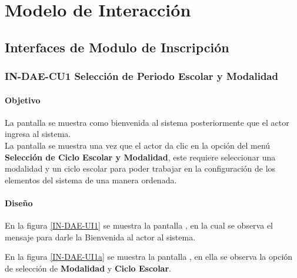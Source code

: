 \chapter{Modelo de Interacción}

\section{Interfaces de Modulo de Inscripción}
\subsection{IN-DAE-CU1 Selección de Periodo Escolar y Modalidad}

\subsubsection{Objetivo}
	
	La pantalla  se muestra como bienvenida al sistema posteriormente que el actor ingresa al sistema.\\
	
	
	La pantalla   se muestra una vez que el actor da clic en la opción del menú \textbf{Selección de Ciclo Escolar y Modalidad}, este requiere seleccionar una modalidad y un ciclo escolar para poder trabajar en la configuración de los elementos del sistema de una manera ordenada.

\subsubsection{Diseño}

    En la figura \ref{IN-DAE-UI1} se muestra la pantalla , en la cual se observa el mensaje  para darle la Bienvenida al actor al sistema.
    
      En la figura \ref{IN-DAE-UI1a} se muestra la pantalla , en ella se observa la opción de selección de \textbf{Modalidad} y \textbf{Ciclo Escolar}.
    
   
